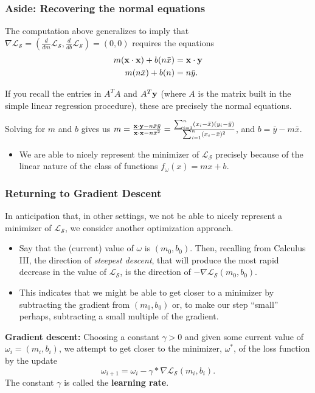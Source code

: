 \documentclass{beamer}
\theoremstyle{example}
\begin{document}
\begin{frame}
    \frametitle{Aside: Recovering the normal equations}
    The computation above generalizes to imply that $\nabla\mathcal L_{\mathcal S} = (\frac{d}{dm}\mathcal L_{\mathcal S}, \frac{d}{db}\mathcal L_{\mathcal S}) = (0,0)$ requires the equations 
        \begin{align*}
            m({\bf x}\cdot{\bf x}) + b(n\bar{x})    &= {\bf x}\cdot{\bf y} \\ 
            m(n\bar{x}) + b(n)                      &= n\bar{y}.
        \end{align*}
    
    \pause 
    If you recall the entries in $A^TA$ and $A^T{\bf y}$ (where $A$ is the matrix built in the simple linear regression procedure), these are precisely the normal equations.

    Solving for $m$ and $b$ gives us $m = \frac{{\bf x}\cdot{\bf y} - n\bar{x}\bar{y}}{{\bf x}\cdot{\bf x} - n\bar{x}^2} = \frac{\sum_{i=1}^n(x_i - \bar{x})(y_i - \bar{y})}{\sum_{i=1}^n(x_i - \bar{x})^2}$, and $b = \bar{y} - m\bar{x}$.

    \pause 
    \begin{itemize}
        \item We are able to nicely represent the minimizer of $\mathcal L_{\mathcal S}$ precisely because of the linear nature of the class of functions $f_{\omega}(x) = mx+b$.
    \end{itemize}
\end{frame}

\begin{frame}
    \frametitle{Returning to Gradient Descent}
    In anticipation that, in other settings, we not be able to nicely represent a minimizer of $\mathcal L_{\mathcal S}$, we consider another optimization approach. 

    \pause
    \begin{itemize}
        \item Say that the (current) value of $\omega$ is $(m_0, b_0)$. Then, recalling from Calculus III, the direction of \textit{steepest descent}, that will produce the most rapid decrease in the value of $\mathcal L_{\mathcal S}$, is the direction of $-\nabla\mathcal L_{\mathcal S}(m_0,b_0)$.
        \item This indicates that we might be able to get closer to a minimizer by subtracting the gradient from $(m_0,b_0)$ or, to make our step ``small'' perhaps, subtracting a small multiple of the gradient.
    \end{itemize}

    \pause
    \textbf{Gradient descent:} Choosing a constant $\gamma > 0$ and given some current value of $\omega_i = (m_i,b_i)$, we attempt to get closer to the minimizer, $\omega^*$, of the loss function by the update 
        \[\omega_{i+1} = \omega_i - \gamma\ast\nabla\mathcal L_{\mathcal S}(m_i,b_i).\]
    The constant $\gamma$ is called the \textbf{learning rate}.
\end{frame}
\end{document}
